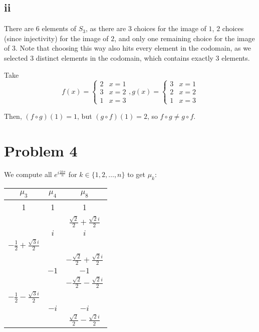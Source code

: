 \documentclass[12pt,letterpaper]{article}
\theoremstyle{definition}
\begin{document}
\subsection*{ii}

There are 6 elements of $S_3$, as there are $3$ choices for the image of $1$,
$2$ choices (since injectivity) for the image of $2$, and only one remaining
choice for the image of $3$. Note that choosing this way also hits every element
in the codomain, as we selected 3 distinct elements in the codomain, which
contains exactly 3 elements.

Take
\[
  f(x) =
  \begin{cases}
    2 & x = 1 \\
    3 & x = 2 \\
    1 & x = 3
  \end{cases},
  g(x) = 
  \begin{cases}
    3 & x = 1 \\
    2 & x = 2 \\
    1 & x = 3
  \end{cases}
\]

Then, $(f \circ g)(1) = 1$, but $(g \circ f)(1) = 2$, so $f \circ g \neq g \circ
f$.

\section*{Problem 4}

We compute all $e^{i\frac{2k\pi}{n}}$ for $k \in \{1,2,\dots,n\}$ to get $\mu_k$:

\begin{center}
  \begin{tabular}{c|c|c}
    $\mu_3$ & $\mu_4$ & $\mu_8$ \\ \hline
    1 & 1 & 1 \\ \hline
    & & $\frac{\sqrt{2}}{2} + \frac{\sqrt{2}i}{2}$ \\ \hline
    & $i$ & $i$ \\ \hline
    $-\frac{1}{2} + \frac{\sqrt{3}i}{2}$ & & \\ \hline
    & & $-\frac{\sqrt{2}}{2} + \frac{\sqrt{2}i}{2}$ \\ \hline
    & $-1$ & $-1$ \\ \hline
    & & $-\frac{\sqrt{2}}{2} - \frac{\sqrt{2}i}{2}$ \\ \hline
    $-\frac{1}{2} - \frac{\sqrt{3}i}{2}$ & & \\ \hline
    & $-i$ & $-i$ \\ \hline
    & & $\frac{\sqrt{2}}{2} - \frac{\sqrt{2}i}{2}$ \\
  \end{tabular}
\end{center}
\end{document}
